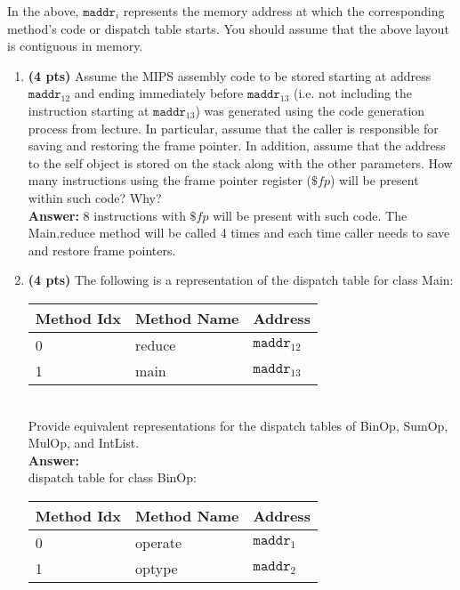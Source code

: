 \documentclass[11pt]{article}
\begin{document}
\begin{enumerate}
  In the above, $\mathtt{maddr}_i$ represents the memory address at which the corresponding method's code or dispatch table starts. You should assume that the above layout is contiguous in memory.
  
  \begin{enumerate}
    \item \textbf{(4 pts)} Assume the MIPS assembly code to be stored starting at address $\mathtt{maddr}_{12}$ and ending immediately before $\mathtt{maddr}_{13}$ (i.e. not including the instruction starting at $\mathtt{maddr}_{13}$) was generated using the code generation process from lecture. In particular, assume that the caller is responsible for saving and restoring the frame pointer. In addition, assume that the address to the self object is stored on the stack along with the other parameters. How many instructions using the frame pointer register ($\$fp$) will be present within such code? Why?\\
    \textbf{Answer:} 
    8 instructions with $\$fp$ will be present with such code. The Main.reduce method will be called 4 times and each time caller needs to save and restore frame pointers.
    
   \newpage
    \item \textbf{(4 pts)} The following is a representation of the dispatch table for class Main: \\
    
    \begin{tabular}{ | l | l | l | }
    \hline
    Method Idx & Method Name & Address \\
    \hline
    0 & reduce & $\mathtt{maddr}_{12}$ \\
    \hline
    1 & main & $\mathtt{maddr}_{13}$ \\
    \hline
    \end{tabular} \\
    
    Provide equivalent representations for the dispatch tables of BinOp, SumOp, MulOp, and IntList.\\
    \textbf{Answer:} \\
	dispatch table for class BinOp: \\
    \begin{tabular}{ | l | l | l | }
    \hline
    Method Idx & Method Name & Address \\
    \hline
    0 & operate & $\mathtt{maddr}_{1}$ \\
    \hline
    1 & optype & $\mathtt{maddr}_{2}$ \\
    \hline
    \end{tabular} \\
	

\end{enumerate}
\end{enumerate}
\end{document}
